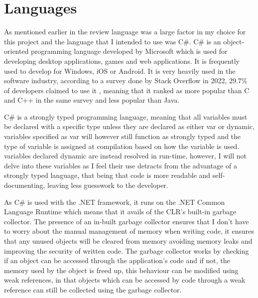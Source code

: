 \section{Languages}
As mentioned earlier in the review language was a large factor in my choice for this project and the language that I intended to use was C\#. C\# is an object-oriented programming language developed by Microsoft which is used for developing desktop applications, games and web applications. It is frequently used to develop for Windows, iOS or Android. It is very heavily used in the software industry, according to a survey done by Stack Overflow in 2022, 29.7\% of developers claimed to use it \cite{stackOverflowSurvey2022}, meaning that it ranked as more popular than C and C++ in the same survey and less popular than Java.
\par
C\# is a strongly typed programming language, meaning that all variables must be declared with a specific type unless they are declared as either var or dynamic, variables specified as var will however still function as strongly typed and the type of variable is assigned at compilation based on how the variable is used. variables declared dynamic are instead resolved in run-time, however, I will not delve into these variables as I feel their use detracts from the advantage of a strongly typed language, that being that code is more readable and self-documenting, leaving less guesswork to the developer.
\par
As C\# is used with the .NET framework, it runs on the .NET Common Language Runtime which means that it avails of the CLR's built-in garbage collector. The presence of an in-built garbage collector ensures that I don't have to worry about the manual management of memory when writing code, it ensures that any unused objects will be cleared from memory avoiding memory leaks and improving the security of written code. The garbage collector works by checking if an object can be accessed through the application's code and if not, the memory used by the object is freed up, this behaviour can be modified using weak references, in that objects which can be accessed by code through a weak reference can still be collected using the garbage collector.

